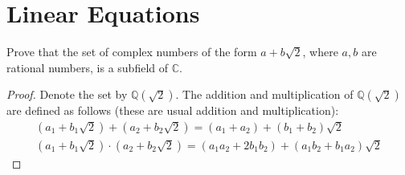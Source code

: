 \chapter{Linear Equations}

\begin{exercise}
    Prove that the set of complex numbers of the form $a + b\sqrt{2}$, where $a, b$ are rational numbers, is a subfield of $\mathbb{C}$.
\end{exercise}

\begin{proof}
    Denote the set by $\mathbb{Q}(\sqrt{2})$. The addition and multiplication of $\mathbb{Q}(\sqrt{2})$ are defined as follows (these are usual addition and multiplication):
    \[
        \begin{split}
            (a_{1} + b_{1}\sqrt{2}) + (a_{2} + b_{2}\sqrt{2}) = (a_{1} + a_{2}) + (b_{1} + b_{2})\sqrt{2} \\
            (a_{1} + b_{1}\sqrt{2}) \cdot (a_{2} + b_{2}\sqrt{2}) = (a_{1}a_{2} + 2b_{1}b_{2}) + (a_{1}b_{2} + b_{1}a_{2})\sqrt{2}
        \end{split}
    \]


\end{proof}
